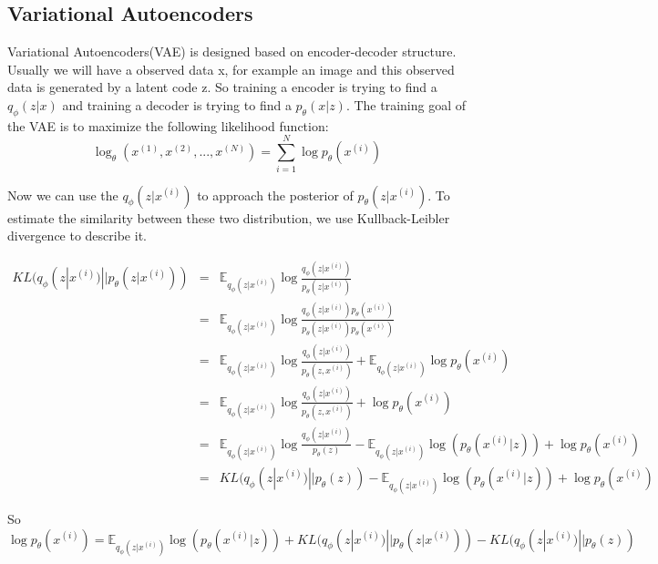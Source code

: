 \documentclass{kththesis}
\begin{document}
\subsection{Variational Autoencoders}
Variational Autoencoders\cite{kingma2013auto,doersch2016tutorial}(VAE) is designed based on encoder-decoder structure. Usually we will have a observed data x, for example an image and this observed data is generated by a latent code z. So training a encoder is trying to find a $q_{\phi}(z|x)$ and training a decoder is trying to find a $p_{\theta}(x|z)$. The training goal of the VAE is to maximize the following likelihood function:
\begin{equation}
    \log_{\theta}(x^{(1)},x^{(2)},...,x^{(N)}) = \sum_{i=1}^{N}\log p_\theta(x^{(i)})
\end{equation}

Now we can use the $q_{\phi}(z|x^{(i)})$ to approach the posterior of $p_{\theta}(z|x^{(i)})$. To estimate the similarity between these two distribution, we use Kullback-Leibler divergence to describe it.

\begin{eqnarray}
KL(q_{\phi}(z|x^{(i)})||p_{\theta}(z|x^{(i)})) &=& \mathbb{E}_{q_{\phi}(z|x^{(i)})} \log \frac{q_{\phi}(z|x^{(i)})}{p_{\theta}(z|x^{(i)})} \nonumber \\
&=& \mathbb{E}_{q_{\phi}(z|x^{(i)})} \log \frac{q_{\phi}(z|x^{(i)})p_{\theta}(x^{(i)})}{p_{\theta}(z|x^{(i)})p_{\theta}(x^{(i)})} \nonumber \\
&=& \mathbb{E}_{q_{\phi}(z|x^{(i)})} \log \frac{q_{\phi}(z|x^{(i)})}{p_{\theta}(z,x^{(i)})}+\mathbb{E}_{q_{\phi}(z|x^{(i)})} \log p_{\theta}(x^{(i)}) \nonumber \\
&=& \mathbb{E}_{q_{\phi}(z|x^{(i)})} \log \frac{q_{\phi}(z|x^{(i)})}{p_{\theta}(z,x^{(i)})}+ \log p_{\theta}(x^{(i)}) \nonumber \\
&=& \mathbb{E}_{q_{\phi}(z|x^{(i)})} \log \frac{q_{\phi}(z|x^{(i)})}{p_{\theta}(z)} -\mathbb{E}_{q_{\phi}(z|x^{(i)})} \log(p_{\theta}(x^{(i)}|z)) + \log p_{\theta}(x^{(i)}) \nonumber \\
&=& KL(q_{\phi}(z|x^{(i)})||p_{\theta}(z)) -\mathbb{E}_{q_{\phi}(z|x^{(i)})} \log(p_{\theta}(x^{(i)}|z)) + \log p_{\theta}(x^{(i)}) \nonumber
\end{eqnarray}

So 
\begin{equation}
    \log p_{\theta}(x^{(i)}) = \mathbb{E}_{q_{\phi}(z|x^{(i)})} \log(p_{\theta}(x^{(i)}|z))+ KL(q_{\phi}(z|x^{(i)})||p_{\theta}(z|x^{(i)})) - KL(q_{\phi}(z|x^{(i)})||p_{\theta}(z))
\end{equation}
\end{document}
